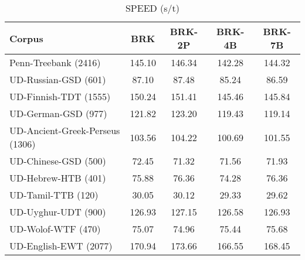 
        \begin{table}[h]
            \centering
            \caption{SPEED (s/t)}
            \label{tab:speed}
            \begin{tabular}{lcccc}
                \hline
                \textbf{Corpus}                 & \textbf{BRK} & \textbf{BRK-2P} & \textbf{BRK-4B} & \textbf{BRK-7B} \\ 
                \hline
                Penn-Treebank (2416)            & 145.10       & 146.34          & 142.28          & 144.32          \\
                UD-Russian-GSD (601)            & 87.10        & 87.48           & 85.24           & 86.59           \\
                UD-Finnish-TDT (1555)           & 150.24       & 151.41          & 145.46          & 145.84          \\
                UD-German-GSD (977)             & 121.82       & 123.20          & 119.43          & 119.14          \\
                UD-Ancient-Greek-Perseus (1306) & 103.56       & 104.22          & 100.69          & 101.55          \\
                UD-Chinese-GSD (500)            & 72.45        & 71.32           & 71.56           & 71.93           \\
                UD-Hebrew-HTB (401)             & 75.88        & 76.36           & 74.28           & 76.36           \\  
                UD-Tamil-TTB (120)              & 30.05        & 30.12           & 29.33           & 29.62           \\
                UD-Uyghur-UDT (900)             & 126.93       & 127.15          & 126.58          & 126.93          \\
                UD-Wolof-WTF (470)              & 75.07        & 74.96           & 75.44           & 75.68           \\
                UD-English-EWT (2077)           & 170.94       & 173.66          & 166.55          & 168.45          \\
                \hline 
            \end{tabular}
        \end{table}


